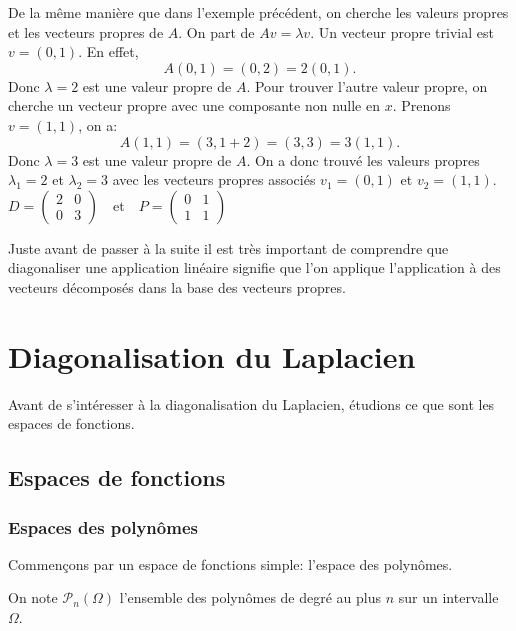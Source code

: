 \documentclass[11pt,a4paper]{article}
\numberwithin{equation}{section}
\theoremstyle{plain}
\theoremstyle{definition}
\theoremstyle{remark}
\begin{document}
\begin{solution}
    De la même manière que dans l'exemple précédent, on cherche les valeurs propres et les vecteurs propres de \(A\).
    On part de $A v = \lambda v$. Un vecteur propre trivial est $v = (0, 1)$.
    En effet,
    \[
        A(0, 1) = (0, 2) = 2(0, 1).
    \]
    Donc $\lambda = 2$ est une valeur propre de $A$.
    Pour trouver l'autre valeur propre, on cherche un vecteur propre avec une composante non nulle en $x$.
    Prenons $v = (1, 1)$, on a:
    \[
        A(1, 1) = (3, 1 + 2) = (3, 3) = 3(1, 1).
    \]
    Donc $\lambda = 3$ est une valeur propre de $A$.
    On a donc trouvé les valeurs propres $\lambda_1 = 2$ et $\lambda_2 = 3$ avec les vecteurs propres associés $v_1 = (0, 1)$ et $v_2 = (1, 1)$.
    \(
        D = \begin{pmatrix}
            2 & 0 \\
            0 & 3
        \end{pmatrix}
        \quad \text{et} \quad
        P = \begin{pmatrix}
            0 & 1 \\
            1 & 1
        \end{pmatrix}
    \)
\end{solution}


Juste avant de passer à la suite il est très important de comprendre que diagonaliser une application linéaire signifie que l'on applique l'application à des vecteurs décomposés dans la base des vecteurs propres.

\section{Diagonalisation du Laplacien}

Avant de s'intéresser à la diagonalisation du Laplacien, étudions ce que sont les espaces de fonctions.

\subsection{Espaces de fonctions}

\subsubsection{Espaces des polynômes}

Commençons par un espace de fonctions simple: l'espace des polynômes.

On note $\mathcal{P}_n(\Omega)$ l'ensemble des polynômes de degré au plus \(n\) sur un intervalle \(\Omega\).
\end{document}
